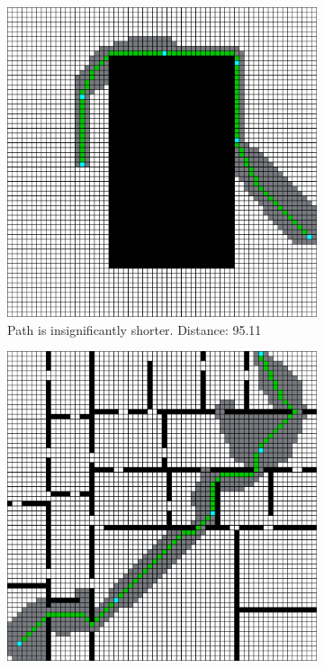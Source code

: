 \begin{figure}[h!]
\begin{subfigure}[b]{0.33\linewidth}
    \includegraphics[width=\linewidth]{images/way-point_nav_2.png}
     \caption{Path is insignificantly shorter. Distance: 95.11} %
  \end{subfigure}
  \hfill
  \begin{subfigure}[b]{0.33\linewidth}
    \includegraphics[width=\linewidth]{images/way-point_nav_3.png}

\end{subfigure}
\end{figure}
